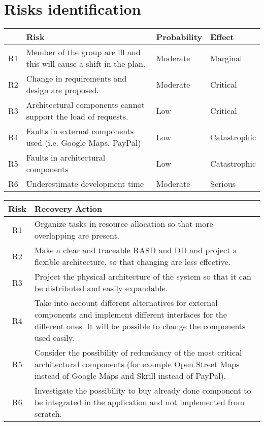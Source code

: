 \section{Risks identification}

{\renewcommand{\arraystretch}{1.5}

\begin{tabularx}{\textwidth}{| c  X | l | l|}
    \hline 
       & \textbf{Risk}                                                          & \textbf{Probability}  & \textbf{Effect}\\ 
    \hline 
    
    R1 & Member of the group are ill and this will cause a shift in the plan.   & Moderate       & Marginal\\
    \hline
    R2 & Change in requirements and design are proposed.                        & Moderate       & Critical\\
    \hline
    R3 & Architectural components cannot support the load of requests.          & Low            & Critical\\
    \hline
    R4 & Faults in external components used (i.e. Google Maps, PayPal)          & Low            & Catastrophic\\
    \hline
    R5 & Faults in architectural components                                     & Low            & Catastrophic\\
    \hline
    R6 & Underestimate development time                                         & Moderate       & Serious\\
    \hline
    
    
\end{tabularx}
\begin{tabularx}{\textwidth}{|c | X|}
    \hline 
    \textbf{Risk} & \textbf{Recovery Action}\\ 
    \hline 
    
    R1 & Organize tasks in resource allocation so that more overlapping are present. \\
    \hline
    R2 & Make a clear and traceable RASD and DD and project a flexible architecture, so that changing are less effective.\\
    \hline
    R3 & Project the physical architecture of the system so that it can be distributed and easily expandable. \\
    \hline
    R4 & Take into account different alternatives for external components and implement different interfaces for the different ones. It will be possible to change the components used easily.\\
    \hline
    R5 & Consider the possibility of redundancy of the most critical architectural components (for example Open Street Maps instead of Google Maps and Skrill instead of PayPal).\\
    \hline
    R6 & Investigate the possibility to buy already done component to be integrated in the application and not implemented from scratch.\\
    \hline
    
\end{tabularx}

}